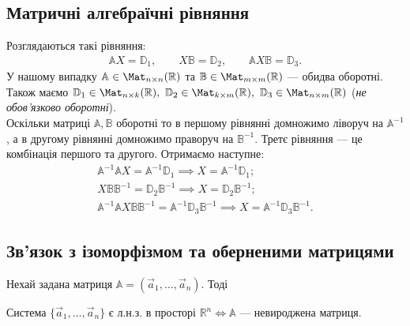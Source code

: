 \documentclass{math_library}
\begin{document}
\subsection{Матричні алгебраїчні рівняння}
Розглядаються такі рівняння:
\begin{align*}
\mathbb{A} X = \mathbb{D}_1, \qquad X \mathbb{B} = \mathbb{D}_2, \qquad \mathbb{A} X \mathbb{B} = \mathbb{D}_3.
\end{align*}
У нашому випадку $\mathbb{A} \in \Mat_{n \times n}(\mathbb{R})$ та $\mathbb{B} \in \Mat_{m \times m}(\mathbb{R})$ --- обидва оборотні. Також маємо $\mathbb{D}_1 \in \Mat_{n \times k}(\mathbb{R}),\ \mathbb{D}_2 \in \Mat_{k \times m}(\mathbb{R}),\ \mathbb{D}_3 \in \Mat_{n \times m}(\mathbb{R})$ (\textit{не обов'язково оборотні}).\\
Оскільки матриці $\mathbb{A},\mathbb{B}$ оборотні то в першому рівнянні домножимо ліворуч на $\mathbb{A}^{-1}$, а в другому рівнянні домножимо праворуч на $\mathbb{B}^{-1}$. Третє рівняння --- це комбінація першого та другого. Отримаємо наступне:
\begin{align*}
\mathbb{A}^{-1} \mathbb{A} X = \mathbb{A}^{-1} \mathbb{D}_1 \implies X = \mathbb{A}^{-1} \mathbb{D}_1; \\
X \mathbb{B} \mathbb{B}^{-1} = \mathbb{D}_2 \mathbb{B}^{-1} \implies X = \mathbb{D}_2 \mathbb{B}^{-1}; \\
\mathbb{A}^{-1} \mathbb{A} X \mathbb{B} \mathbb{B}^{-1} = \mathbb{A}^{-1} \mathbb{D}_3 \mathbb{B}^{-1} \implies X = \mathbb{A}^{-1} \mathbb{D}_3 \mathbb{B}^{-1}.
\end{align*}

\subsection{Зв'язок з ізоморфізмом та оберненими матрицями}
\begin{theorem}
Нехай задана матриця $\mathbb{A} = (\vec{a}_1,\dots,\vec{a}_n)$. Тоді
\begin{center}
Система $\{\vec{a}_1, \dots, \vec{a}_n\}$ є л.н.з. в просторі $\mathbb{R}^n \iff \mathbb{A}$ --- невироджена матриця.
\end{center}
\end{theorem}
\end{document}
